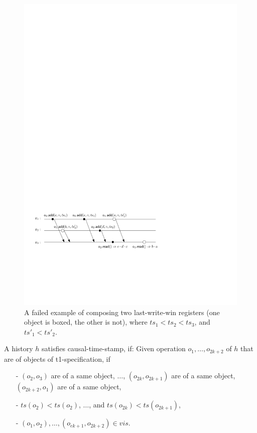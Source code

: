 {\begin{figure}[t]
  \centering
  \includegraphics[width=0.7 \textwidth]{figures/LWWReg-LWWReg-NoSTS.pdf}
\vspace{-10pt}
  \caption{A failed example of composing two last-write-win registers (one object is boxed, the other is not), where $\mathit{ts}_1 < \mathit{ts}_2 < \mathit{ts}_3$, and $\mathit{ts}'_1 < \mathit{ts}'_2$.}
  \label{fig:a failed example of composing two last-write-win registers}
\end{figure}


A history $h$ satisfies causal-time-stamp, if: Given operation $o_1,\ldots,o_{\mathit{2k+2}}$ of $h$ that are of objects of t1-specification, if

\begin{itemize}
\setlength{\itemsep}{0.5pt}
\item[-] $(o_2,o_3)$ are of a same object, $\ldots$, $(o_{\mathit{2k}},o_{\mathit{2k+1}})$ are of a same object, $(o_{\mathit{2k+2}},o_1)$ are of a same object,

\item[-] $\mathit{ts}(o_2) < \mathit{ts}(o_2)$, $\ldots$, and $\mathit{ts}(o_{\mathit{2k}}) < \mathit{ts}(o_{\mathit{2k+1}})$,

\item[-] $(o_1,o_2), \ldots, (o_{\mathit{ek+1}},o_{\mathit{2k+2}}) \in \mathit{vis}$.
\end{itemize}

}
